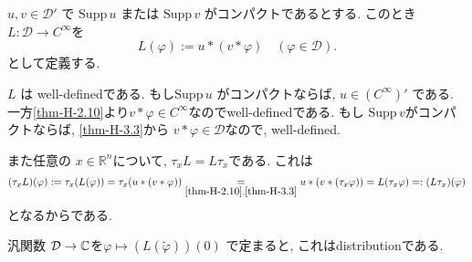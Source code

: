 
\begin{tcolorbox}[mybox]
\begin{defn}\cite[Definition 6.36]{Rud}
\label{defn-H-3.4}
\( u, v \in \mathcal{D}' \) で
\(\mathrm{Supp}\, u\) または \(\mathrm{Supp}\, v\) がコンパクトであるとする. 
このとき
 \( L : \mathcal{D} \to C^\infty \)を
\[
L(\varphi) := u \ast (v \ast \varphi) \quad (\varphi \in \mathcal{D}).
\]
として定義する. 
\end{defn}
\end{tcolorbox}

\begin{rem}
\label{rem-H-3.5}
 \(L\) は well-definedである. 
 もし\(\mathrm{Supp}\, u\) がコンパクトならば, \(u \in (C^\infty)'\) である. 一方\ref{thm-H-2.10}より$v \ast \varphi \in C^{\infty}$なのでwell-definedである. 
もし \(\mathrm{Supp}\, v\)がコンパクトならば, \ref{thm-H-3.3}から \(v \ast \varphi \in \mathcal{D}\)なので, well-defined.

また任意の \(x \in \mathbb{R}^n\)について, \(\tau_x L = L \tau_x\)である.
これは
$$
(\tau_x L )(\varphi) 
:=\tau_x (L (\varphi))
= \tau_x ( u \ast (v \ast \varphi))
\underset{\ref{thm-H-2.10}, \ref{thm-H-3.3}}{=}
u \ast (v \ast (\tau_x \varphi))
=
L(\tau_x \varphi)
=:
(L\tau_x  )(\varphi) 
$$
となるからである. 
\end{rem}

\begin{tcolorbox}[mybox]
\begin{lem}
\label{lem-H-3.6}
汎関数 \( \mathcal{D} \to \mathbb{C} \)を\( \varphi \mapsto (L(\widetilde{\varphi}))(0) \) で定まると, これはdistributionである. 
\end{lem}
\end{tcolorbox}

